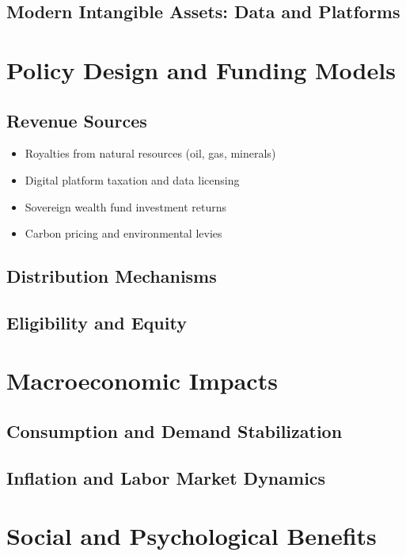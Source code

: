 \documentclass[11pt]{article}
\begin{document}
\subsection{Modern Intangible Assets: Data and Platforms}
\lipsum[5-6]

\section{Policy Design and Funding Models}
\subsection{Revenue Sources}
\begin{itemize}
\item Royalties from natural resources (oil, gas, minerals)
\item Digital platform taxation and data licensing
\item Sovereign wealth fund investment returns
\item Carbon pricing and environmental levies
\end{itemize}

\subsection{Distribution Mechanisms}
\lipsum[7-8]

\subsection{Eligibility and Equity}
\lipsum[9-10]

\section{Macroeconomic Impacts}
\subsection{Consumption and Demand Stabilization}
\lipsum[11-12]

\subsection{Inflation and Labor Market Dynamics}
\lipsum[13-14]

\section{Social and Psychological Benefits}
\end{document}
